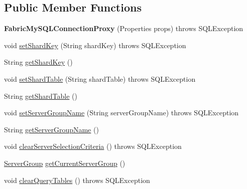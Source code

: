 \subsection*{Public Member Functions}
\begin{DoxyCompactItemize}
\item 
\mbox{\label{classcom_1_1mysql_1_1fabric_1_1jdbc_1_1_fabric_my_s_q_l_connection_proxy_af56dfeb0134146901ecb0f83d740b6dc}} 
{\bfseries Fabric\+My\+S\+Q\+L\+Connection\+Proxy} (Properties props)  throws S\+Q\+L\+Exception 
\item 
void \mbox{\hyperlink{classcom_1_1mysql_1_1fabric_1_1jdbc_1_1_fabric_my_s_q_l_connection_proxy_ace89320543442af9fbe6034a4171333b}{set\+Shard\+Key}} (String shard\+Key)  throws S\+Q\+L\+Exception 
\item 
String \mbox{\hyperlink{classcom_1_1mysql_1_1fabric_1_1jdbc_1_1_fabric_my_s_q_l_connection_proxy_a10e5d6a447e761dbc2bf2c84485036fe}{get\+Shard\+Key}} ()
\item 
void \mbox{\hyperlink{classcom_1_1mysql_1_1fabric_1_1jdbc_1_1_fabric_my_s_q_l_connection_proxy_a3dd3f50c8de7678f002bae64114643c3}{set\+Shard\+Table}} (String shard\+Table)  throws S\+Q\+L\+Exception 
\item 
String \mbox{\hyperlink{classcom_1_1mysql_1_1fabric_1_1jdbc_1_1_fabric_my_s_q_l_connection_proxy_ae176bb68596e935c8484d85611116c81}{get\+Shard\+Table}} ()
\item 
void \mbox{\hyperlink{classcom_1_1mysql_1_1fabric_1_1jdbc_1_1_fabric_my_s_q_l_connection_proxy_a288c67fc74fabc15a7a108d28ff6c52b}{set\+Server\+Group\+Name}} (String server\+Group\+Name)  throws S\+Q\+L\+Exception 
\item 
String \mbox{\hyperlink{classcom_1_1mysql_1_1fabric_1_1jdbc_1_1_fabric_my_s_q_l_connection_proxy_ae95ee3dba66db1708e523e8cec989ab5}{get\+Server\+Group\+Name}} ()
\item 
void \mbox{\hyperlink{classcom_1_1mysql_1_1fabric_1_1jdbc_1_1_fabric_my_s_q_l_connection_proxy_a386a5ba420d486c6a8778b9d611c265b}{clear\+Server\+Selection\+Criteria}} ()  throws S\+Q\+L\+Exception 
\item 
\mbox{\hyperlink{classcom_1_1mysql_1_1fabric_1_1_server_group}{Server\+Group}} \mbox{\hyperlink{classcom_1_1mysql_1_1fabric_1_1jdbc_1_1_fabric_my_s_q_l_connection_proxy_a3daf5c72d89cbbfc7fe2d0fda11e7441}{get\+Current\+Server\+Group}} ()
\item 
void \mbox{\hyperlink{classcom_1_1mysql_1_1fabric_1_1jdbc_1_1_fabric_my_s_q_l_connection_proxy_a797863b7d0a0798ce065d21b06a9f76d}{clear\+Query\+Tables}} ()  throws S\+Q\+L\+Exception 

\end{DoxyCompactItemize}
